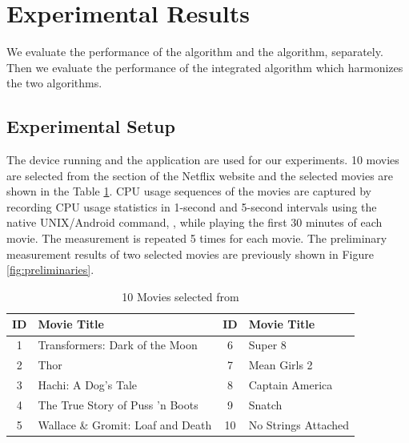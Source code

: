 \section{Experimental Results}
\label{sec:experiments}

We evaluate the performance of the  algorithm and the  algorithm, separately.
Then we evaluate the performance of the integrated algorithm which harmonizes the two algorithms. 

\subsection{Experimental Setup}
\label{sec:experimental_setup}

The  device running  and the  application are used for our experiments. 
10 movies are selected from the  section of the Netflix website and the selected movies are shown in the Table \ref{tab:movies}.
CPU usage sequences of the movies are captured by recording CPU usage statistics in 1-second and 5-second intervals using the native UNIX/Android command, , while playing the first 30 minutes of each movie. 
The measurement is repeated 5 times for each movie.
The preliminary measurement results of two selected movies are previously shown in Figure \ref{fig:preliminaries}.

\begin{table}[!t]
\begin{center}
\begin{tabular}{|c | m{5cm} ||c| m{5cm}|}
\hline
ID & Movie Title & ID & Movie Title \\ 
\hline
1 & Transformers: Dark of the Moon 		& 6 & Super 8\\
2 & Thor					& 7 & Mean Girls 2 \\
3 & Hachi: A Dog's Tale 			& 8 & Captain America \\
4 & The True Story of Puss 'n Boots 		& 9 &  Snatch \\
5 & Wallace \& Gromit: Loaf and Death 	& 10 & No Strings Attached \\
\hline
\end{tabular}
\end{center}
\caption{10 Movies selected from }
\label{tab:movies}
\end{table}

